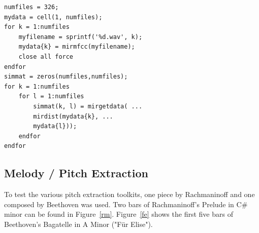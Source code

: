 \lstset{language=Matlab}          %
\FloatBarrier

\begin{lstlisting}[frame=single,label={lst:MIRmat},
caption={MATLAB code for estimating similarities based on MFCCs},captionpos=b]  % Start your code-block
numfiles = 326;
mydata = cell(1, numfiles);
for k = 1:numfiles
	myfilename = sprintf('%d.wav', k);
	mydata{k} = mirmfcc(myfilename);
	close all force
endfor
simmat = zeros(numfiles,numfiles);
for k = 1:numfiles
	for l = 1:numfiles
		simmat(k, l) = mirgetdata( ...
		mirdist(mydata{k}, ...
		mydata{l}));
	endfor
endfor
\end{lstlisting}
\FloatBarrier

\subsection{Melody / Pitch Extraction}\label{midiest}
To test the various pitch extraction toolkits, one piece by Rachmaninoff and one composed by Beethoven was used. Two bars of Rachmaninoff's Prelude in C\# minor can be found in Figure~\ref{rm}. Figure~\ref{fe} shows the first five bars of Beethoven's Bagatelle in A Minor ("Für Elise").
